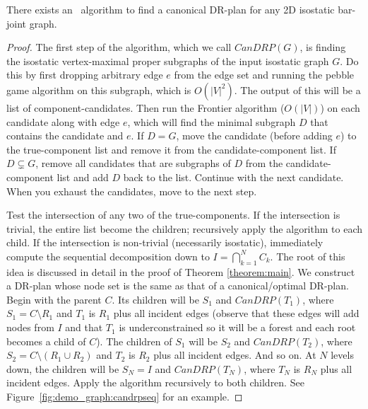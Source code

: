 \begin{theorem}\label{theorem:algo_complexity}
    There exists an \candrpcomplexityv\ algorithm to find a canonical DR-plan for any 2D isostatic bar-joint graph.
\end{theorem}

\begin{proof}
The first step of the algorithm, which we call $CanDRP(G)$, is finding the isostatic vertex-maximal proper subgraphs of the input isostatic graph $G$. Do this by first dropping arbitrary edge $e$ from the edge set and running the pebble game algorithm \cite{Jacobs:1997:PG} on this subgraph, which is $O(|V|^2)$. The output of this will be a list of component-candidates. Then run the Frontier algorithm \cite{hoffman2001decompositionII} \cite{lomonosov2004graph} ($O(|V|)$) on each candidate along with edge $e$, which will find the minimal subgraph $D$ that contains the candidate and $e$. If $D=G$, move the candidate (before adding $e$) to the true-component list and remove it from the candidate-component list. If $D\subsetneq G$, remove all candidates that are subgraphs of $D$ from the candidate-component list and add $D$ back to the list. Continue with the next candidate. When you exhaust the candidates, move to the next step.

Test the intersection of any two of the true-components. If the intersection is trivial, the entire list become the children; recursively apply the algorithm to each child. If the intersection is non-trivial (necessarily isostatic), immediately compute the sequential decomposition down to $I=\bigcap_{k=1}^{N}{C_k}$. The root of this idea is discussed in detail in the proof of Theorem \ref{theorem:main}. We construct a DR-plan whose node set is the same as that of a canonical/optimal DR-plan. Begin with the parent $C$. Its children will be $S_1$ and $CanDRP(T_1)$, where $S_1=C\setminus R_1$ and $T_1$ is $R_1$ plus all incident edges (observe that these edges will add nodes from $I$ and that $T_1$ is underconstrained so it will be a forest and each root becomes a child of $C$). The children of $S_1$ will be $S_2$ and $CanDRP(T_2)$, where $S_2=C\setminus (R_1\cup R_2)$ and $T_2$ is $R_2$ plus all incident edges. And so on. At $N$ levels down, the children will be $S_N=I$ and $CanDRP(T_N)$, where $T_N$ is $R_N$ plus all incident edges. Apply the algorithm recursively to both children. See Figure~\ref{fig:demo_graph:candrpseq} for an example. 


\end{proof}
